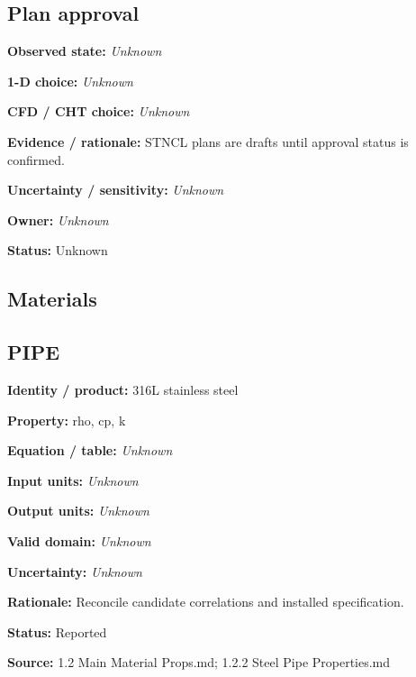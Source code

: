 \documentclass[11pt]{article}
\begin{document}
\par\noindent\begin{minipage}{\textwidth}\small\setlength{\parskip}{2pt}
\subsection*{Plan approval}
\textbf{Observed state:} \textit{Unknown}\par
\textbf{1-D choice:} \textit{Unknown}\par
\textbf{CFD / CHT choice:} \textit{Unknown}\par
\textbf{Evidence / rationale:} STNCL plans are drafts until approval status is confirmed.\par
\textbf{Uncertainty / sensitivity:} \textit{Unknown}\par
\textbf{Owner:} \textit{Unknown}\par
\textbf{Status:} Unknown\par
\end{minipage}\par\vspace{5pt}
\clearpage\subsection{Materials}
\par\noindent\begin{minipage}{\textwidth}\small\setlength{\parskip}{2pt}
\subsection*{PIPE}
\textbf{Identity / product:} 316L stainless steel\par
\textbf{Property:} rho, cp, k\par
\textbf{Equation / table:} \textit{Unknown}\par
\textbf{Input units:} \textit{Unknown}\par
\textbf{Output units:} \textit{Unknown}\par
\textbf{Valid domain:} \textit{Unknown}\par
\textbf{Uncertainty:} \textit{Unknown}\par
\textbf{Rationale:} Reconcile candidate correlations and installed specification.\par
\textbf{Status:} Reported\par
\textbf{Source:} 1.2 Main Material Props.md; 1.2.2 Steel Pipe Properties.md\par
\end{minipage}\par\vspace{5pt}
\end{document}
